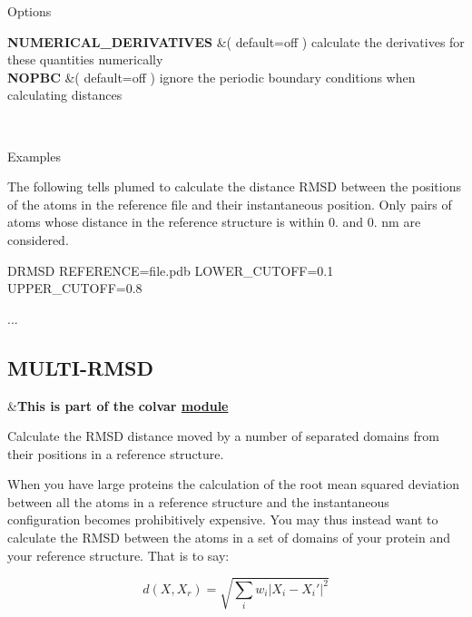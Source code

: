 \begin{DoxyParagraph}{Options}

\end{DoxyParagraph}
\begin{TabularC}{2}
\hline
{\bfseries  N\+U\+M\+E\+R\+I\+C\+A\+L\+\_\+\+D\+E\+R\+I\+V\+A\+T\+I\+V\+E\+S } &( default=off ) calculate the derivatives for these quantities numerically   \\
{\bfseries  N\+O\+P\+B\+C } &( default=off ) ignore the periodic boundary conditions when calculating distances  

\\
\end{TabularC}


\begin{DoxyParagraph}{Examples}

\end{DoxyParagraph}
The following tells plumed to calculate the distance R\+M\+S\+D between the positions of the atoms in the reference file and their instantaneous position. Only pairs of atoms whose distance in the reference structure is within 0. and 0. nm are considered.

\begin{DoxyVerb}DRMSD REFERENCE=file.pdb LOWER_CUTOFF=0.1 UPPER_CUTOFF=0.8
\end{DoxyVerb}


... \hypertarget{MULTI-RMSD}{}\subsection{M\+U\+L\+T\+I-\/\+R\+M\+S\+D}\label{MULTI-RMSD}
\begin{TabularC}{2}
\hline
&{\bfseries  This is part of the colvar \hyperlink{mymodules}{module }}   \\
\end{TabularC}
Calculate the R\+M\+S\+D distance moved by a number of separated domains from their positions in a reference structure.

When you have large proteins the calculation of the root mean squared deviation between all the atoms in a reference structure and the instantaneous configuration becomes prohibitively expensive. You may thus instead want to calculate the R\+M\+S\+D between the atoms in a set of domains of your protein and your reference structure. That is to say\+:

\[ d(X,X_r) = \sqrt{ \sum_{i} w_i\vert X_i - X_i' \vert^2 } \]

